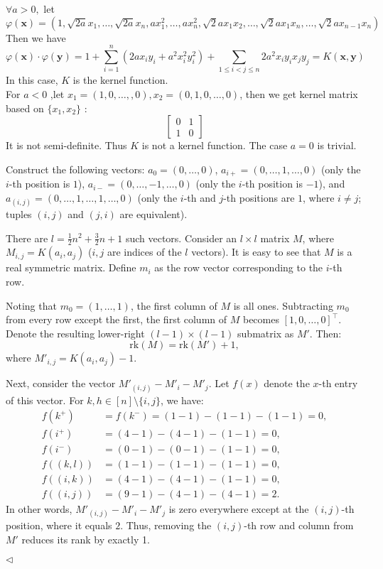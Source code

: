 \documentclass[11pt]{article}
\newenvironment{answer}[1][Answer]{\begin{trivlist}
\item[\hskip \labelsep {\bfseries #1.}\hskip \labelsep]}{\hfill$\lhd$\end{trivlist}}
\begin{document}
\begin{answer}
    \item [(1)]
    $\forall a>0, $ let $\varphi(\boldsymbol{x}) = (1,\sqrt{2a}x_1,\dots,\sqrt{2a}x_n,ax_1^2,\dots,ax_n^2,\sqrt{2}ax_1x_2,\dots,\sqrt{2}ax_1x_n,\dots,\sqrt{2}ax_{n-1}x_n)$
Then we have 
$$\varphi(\boldsymbol{x})\cdot\varphi(\boldsymbol{y}) = 1+\sum_{i=1}^n(2ax_iy_i+a^2x_i^2y_i^2)+\sum_{1\leq i< j\leq n}2a^2x_iy_ix_jy_j = K(\boldsymbol{x},\boldsymbol{y})$$
In this case, $K$ is the kernel function.\\
For $a<0$ ,let $x_1 = (1,0,\dots,,0),x_2 = (0,1,0,\dots,0)$, then we get kernel matrix based on $\{x_1,x_2\}$ :
$$\begin{bmatrix}0&1\\1&0\end{bmatrix}$$
It is not semi-definite. Thus $K$ is not a kernel function.
The case $a = 0$ is trivial.
    \item [(2)]
Construct the following vectors: \( a_0 = (0, \dots, 0) \), \( a_{i+} = (0, \dots, 1, \dots, 0) \) (only the \( i \)-th position is \( 1 \)), \( a_{i-} = (0, \dots, -1, \dots, 0) \) (only the \( i \)-th position is \( -1 \)), and \( a_{(i,j)} = (0, \dots, 1, \dots, 1, \dots, 0) \) (only the \( i \)-th and \( j \)-th positions are \( 1 \), where \( i \neq j \); tuples \( (i, j) \) and \( (j, i) \) are equivalent). 

There are \( l = \frac{1}{2}n^2 + \frac{3}{2}n + 1 \) such vectors. Consider an \( l \times l \) matrix \( M \), where \( M_{i,j} = K(a_i, a_j) \) (\( i, j \) are indices of the \( l \) vectors). It is easy to see that \( M \) is a real symmetric matrix. Define \( m_i \) as the row vector corresponding to the \( i \)-th row.

Noting that \( m_0 = (1, \dots, 1) \), the first column of \( M \) is all ones. Subtracting \( m_0 \) from every row except the first, the first column of \( M \) becomes \( [1, 0, \dots, 0]^\top \). Denote the resulting lower-right \((l-1) \times (l-1)\) submatrix as \( M' \). Then:
\[
\mathrm{rk}(M) = \mathrm{rk}(M') + 1,
\]
where \( M'_{i,j} = K(a_i, a_j) - 1 \).

Next, consider the vector \( M'_{(i,j)} - M'_{i} - M'_{j} \). Let \( f(x) \) denote the \( x \)-th entry of this vector. For \( k, h \in [n] \setminus \{i, j\} \), we have:
\[
\begin{aligned}
    f(k^+) &= f(k^-) = (1-1) - (1-1) - (1-1) = 0, \\
    f(i^+) &= (4-1) - (4-1) - (1-1) = 0, \\
    f(i^-) &= (0-1) - (0-1) - (1-1) = 0, \\
    f((k, l)) &= (1-1) - (1-1) - (1-1) = 0, \\
    f((i, k)) &= (4-1) - (4-1) - (1-1) = 0, \\
    f((i, j)) &= (9-1) - (4-1) - (4-1) = 2.
\end{aligned}
\]
In other words, \( M'_{(i,j)} - M'_{i} - M'_{j} \) is zero everywhere except at the \( (i, j) \)-th position, where it equals \( 2 \). Thus, removing the \( (i, j) \)-th row and column from \( M' \) reduces its rank by exactly 1.


\end{answer}
\end{document}
